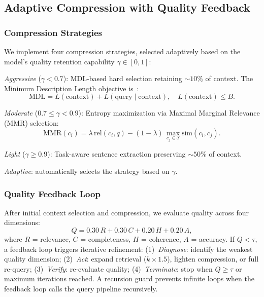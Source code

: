 \documentclass[11pt,a4paper]{article}
\begin{document}
\subsection{Adaptive Compression with Quality Feedback}
\label{sec:compression}

\subsubsection{Compression Strategies}

We implement four compression strategies, selected adaptively based on the
model's quality retention capability $\gamma \in [0,1]$:

\emph{Aggressive} ($\gamma < 0.7$): MDL-based hard selection retaining
${\sim}10\%$ of context.  The Minimum Description Length objective
is~\cite{grunwald2007mdl}:
\begin{equation}
  \mathrm{MDL} = L(\text{context}) + L(\text{query} \mid \text{context}),
  \quad L(\text{context}) \leq B.
  \label{eq:mdl}
\end{equation}

\emph{Moderate} ($0.7 \leq \gamma < 0.9$): Entropy maximization via
Maximal Marginal Relevance (MMR) selection:
\begin{equation}
  \mathrm{MMR}(c_i) =
    \lambda\, \mathrm{rel}(c_i, q)
    - (1-\lambda)\,
      \max_{c_j \in \mathcal{S}} \mathrm{sim}(c_i, c_j).
  \label{eq:mmr}
\end{equation}

\emph{Light} ($\gamma \geq 0.9$): Task-aware sentence extraction preserving
${\sim}50\%$ of context.

\emph{Adaptive}: automatically selects the strategy based on $\gamma$.

\subsubsection{Quality Feedback Loop}

After initial context selection and compression, we evaluate quality across
four dimensions:
\begin{equation}
  Q = 0.30\,R + 0.30\,C + 0.20\,H + 0.20\,A,
  \label{eq:quality}
\end{equation}
where $R$ = relevance, $C$ = completeness, $H$ = coherence, $A$ = accuracy.
If $Q < \tau$, a feedback loop triggers iterative refinement:
(1)~\emph{Diagnose}: identify the weakest quality dimension;
(2)~\emph{Act}: expand retrieval ($k \times 1.5$), lighten compression, or
full re-query;
(3)~\emph{Verify}: re-evaluate quality;
(4)~\emph{Terminate}: stop when $Q \geq \tau$ or maximum iterations reached.
A recursion guard prevents infinite loops when the feedback loop calls the
query pipeline recursively.
\end{document}
